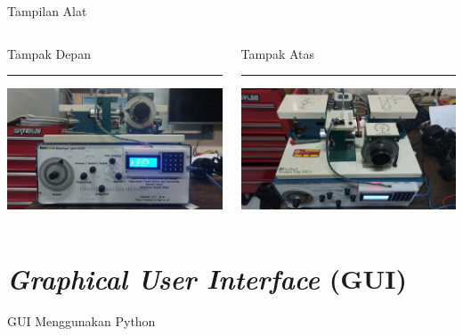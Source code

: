\documentclass[10pt,xcolor={dvipsnames}]{beamer}
\begin{document}
\begin{frame}{Tampilan Alat}
	\begin{columns}[T] %
		\begin{column}{0.48\textwidth}
			Tampak Depan
			\color{black}\rule{\linewidth}{4pt}
			\includegraphics[width=7.5cm]{Gambar Lain/TampakDepan.jpeg}
		\end{column}%
		\hfill%
		\begin{column}{0.48\textwidth}
			Tampak Atas
			\color{blue}\rule{\linewidth}{4pt}
			\includegraphics[width=7.5cm]{Gambar Lain/TampakAtas.jpeg}
		\end{column}
	\end{columns}
\end{frame}
\section{\textit{Graphical User Interface} (GUI)}
\begin{frame}{GUI Menggunakan Python}
	\centering
\end{frame}
\end{document}
